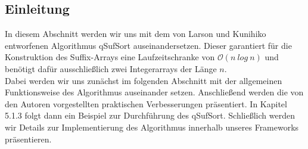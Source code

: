 \newtheorem{lemma}{Lemma}
\subsection{Einleitung}
In  diesem Abschnitt werden wir uns mit dem von Larson und Kunihiko entworfenen Algorithmus qSufSort\cite{saca:1} auseinandersetzen.
Dieser garantiert für die Konstruktion des Suffix-Arrays eine Laufzeitschranke von $\mathcal{O}(n\ log\ n)$ und benötigt dafür ausschließlich zwei Integerarrays der Länge $n$.\\
Dabei werden wir uns zunächst im folgenden Abschnitt mit der allgemeinen Funktionsweise des Algorithmus auseinander setzen. Anschließend werden die von den Autoren vorgestellten praktischen Verbesserungen präsentiert. In Kapitel 5.1.3 folgt dann ein Beispiel zur Durchführung des qSufSort. Schließlich werden wir Details zur Implementierung des Algorithmus innerhalb unseres Frameworks präsentieren.
